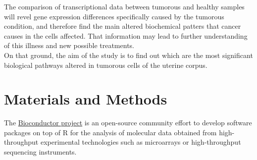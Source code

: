\documentclass[9pt,twocolumn,twoside]{gsajnl}
\begin{document}
The comparison of transcriptional data between tumorous and healthy samples will revel gene expression differences specifically caused by the tumorous condition, and therefore find the main altered biochemical patters that cancer causes in the cells affected. That information may lead to further understanding of this illness and new possible treatments. \\
\newline
On that ground, the aim of the study is to find out which are the most significant biological pathways altered in tumorous cells of the uterine corpus. 
 




\section*{Materials and Methods}

The \href{http://www.bioconductor.org}{Bioconductor project} is an open-source community effort to develop software packages on top of R for the analysis of molecular data obtained from high-throughput experimental technologies such as microarrays or high-throughput sequencing instruments.
\end{document}
